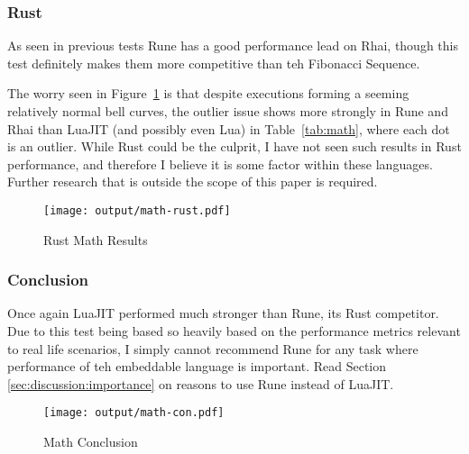 \subsubsection{Rust}
As seen in previous tests Rune has a good performance lead on Rhai, though this test definitely makes them more competitive than teh Fibonacci Sequence.

The worry seen in Figure~\ref{fig:math-rust} is that despite executions forming a seeming relatively normal bell curves, the outlier issue shows more strongly in Rune and Rhai than LuaJIT (and possibly even Lua) in Table~\ref{tab:math}, where each dot is an outlier. While Rust could be the culprit, I have not seen such results in Rust performance, and therefore I believe it is some factor within these languages. Further research that is outside the scope of this paper is required.

\begin{figure}[H]
	\centering
		\texttt{[image: output/math-rust.pdf]}
	\caption{Rust Math Results}
	\label{fig:math-rust}
\end{figure}

\subsubsection{Conclusion}
Once again LuaJIT performed much stronger than Rune, its Rust competitor. Due to this test being based so heavily based on the performance metrics relevant to real life scenarios, I simply cannot recommend Rune for any task where performance of teh embeddable language is important. Read Section \ref{sec:discussion:importance} on reasons to use Rune instead of LuaJIT.

\begin{figure}[H]
	\centering
		\texttt{[image: output/math-con.pdf]}
	\caption{Math Conclusion}
	\label{fig:math-con}
\end{figure}
